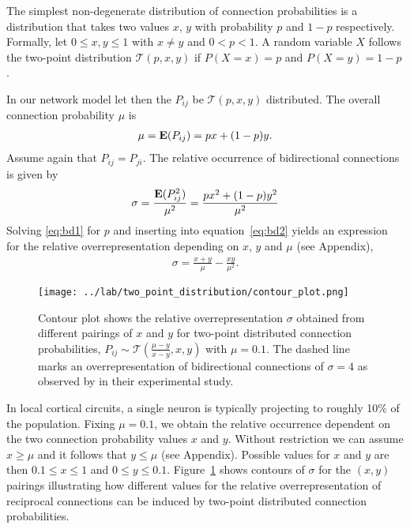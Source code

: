 
The simplest non-degenerate distribution of connection probabilities is a distribution that takes two values $x$, $y$ with probability $p$ and $1-p$ respectively. Formally, let $0 \leq x,y \leq 1$ with $x \neq y$  and $0 < p < 1$. A random variable $X$ follows the two-point distribution %
$\mathcal{T}(p,x,y)$ if $P(X=x)=p$ and $P(X=y) = 1-p$. 

In our network model let then the $P_{ij}$ be $\mathcal{T}(p,x,y)$ distributed. The overall connection probability $\mu$ is
\begin{align}
\mu = \operatorname{\mathbf{E}}(P_{ij}) = px + (1-p)y. \label{eq:bd1}
\end{align}
Assume again that $P_{ij} = P_{ji}$. The relative occurrence of bidirectional connections is given by
\begin{align}
  \sigma = \frac{\operatorname{\mathbf{E}}(P_{ij}^2)}{\mu^2} = \frac{p x^2 + (1-p) y^2}{\mu^2} \label{eq:bd2}
\end{align}
Solving \eqref{eq:bd1} for $p$ and inserting into equation~\eqref{eq:bd2} yields an expression for the relative overrepresentation depending on $x$, $y$ and $\mu$ (see Appendix),
\begin{align}
\sigma = \frac{x+y}{\mu} - \frac{xy}{\mu^2}.
\end{align}

\begin{figure}[h!]
\centering
\texttt{[image: ../lab/two\_point\_distribution/contour\_plot.png]}
\caption{Contour plot shows the relative overrepresentation $\sigma$ obtained from different pairings of $x$ and $y$ for two-point distributed connection probabilities, $P_{ij} \sim \mathcal{T}(\frac{\mu-y}{x-y},x,y)$ with $\mu = 0.1$. The dashed line marks an overrepresentation of bidirectional connections of $\sigma=4$ as observed by \textcite{Song2005} in their experimental study.}
\label{fig:tp}
\end{figure}

In local cortical circuits, a single neuron is typically projecting to roughly 10\% of the population. Fixing $\mu = 0.1$, we obtain the relative occurrence dependent on the two connection probability values $x$ and $y$. Without restriction we can assume $x \geq \mu$ and it follows that $y \leq \mu$ (see Appendix). Possible values for $x$ and $y$ are then $0.1 \leq x \leq 1$ and $0 \leq y \leq 0.1$. Figure~\ref{fig:tp} shows contours of $\sigma$ for the $(x,y)$ pairings illustrating how different values for the relative overrepresentation of reciprocal connections can be induced by two-point distributed connection probabilities.  






